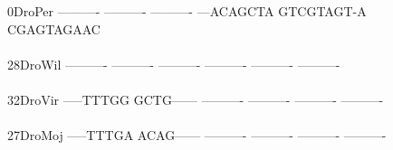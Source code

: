 \documentclass[11pt,twoside,reqno,a4paper]{article}
\begin{document}
{0\hspace*{3\charwidth}DroPer	----------	----------	----------	---ACAGCTA	GTCGTAGT-A	CGAGTAGAAC	\\
\hspace*{4\charwidth}\hspace*{7\charwidth}\hspace*{1\charwidth}\hspace*{1\charwidth}\hspace*{1\charwidth}\hspace*{1\charwidth}\hspace*{1\charwidth}\hspace*{1\charwidth}\\
28\hspace*{2\charwidth}DroWil	----------	----------	----------	----------	----------	----------	\\
\hspace*{4\charwidth}\hspace*{7\charwidth}\hspace*{1\charwidth}\hspace*{1\charwidth}\hspace*{1\charwidth}\hspace*{1\charwidth}\hspace*{1\charwidth}\hspace*{1\charwidth}\\
32\hspace*{2\charwidth}DroVir	-----TTTGG	GCTG------	----------	----------	----------	----------	\\
\hspace*{4\charwidth}\hspace*{7\charwidth}\hspace*{1\charwidth}\hspace*{1\charwidth}\hspace*{1\charwidth}\hspace*{1\charwidth}\hspace*{1\charwidth}\hspace*{1\charwidth}\\
27\hspace*{2\charwidth}DroMoj	-----TTTGA	ACAG------	----------	----------	----------	----------	\\
\hspace*{4\charwidth}\hspace*{7\charwidth}\hspace*{1\charwidth}\hspace*{1\charwidth}\hspace*{1\charwidth}\hspace*{1\charwidth}\hspace*{1\charwidth}\hspace*{1\charwidth}\\
}
\end{document}
